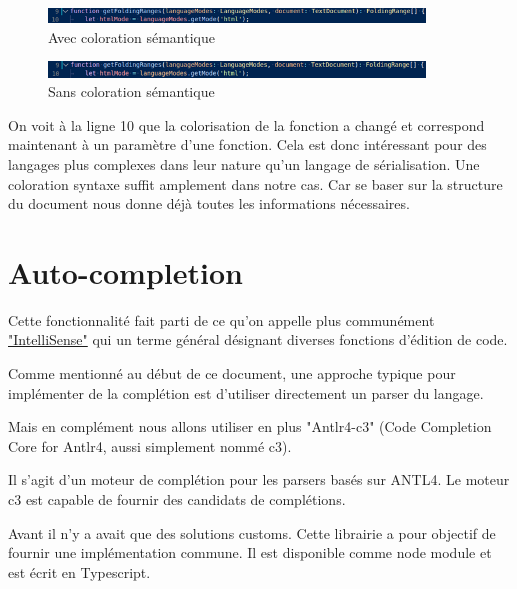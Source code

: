 \documentclass[
    iict, %
    il, %
]{heig-tb}
\begin{document}
\begin{figure}[!ht]
    \begin{center}
        \includegraphics[width=10cm]{assets/figures/semantic-coloration-with.png}
    \end{center}
    \caption[Avec coloration sémantique ]{\label{semantic-coloration-with} Avec coloration sémantique }
\end{figure}

\begin{figure}[!ht]
    \begin{center}
        \includegraphics[width=10cm]{assets/figures/semantic-coloration-without.png}
    \end{center}
    \caption[Sans coloration sémantique]{\label{semantic-coloration-without} Sans coloration sémantique}
\end{figure}

On voit à la ligne 10 que la colorisation de la fonction a changé et correspond maintenant à un paramètre d'une fonction.
Cela est donc intéressant pour des langages plus complexes dans leur nature qu'un langage de sérialisation. Une coloration syntaxe suffit amplement dans notre cas. Car se baser sur la structure du document nous donne déjà toutes les informations nécessaires.

\section{Auto-completion}
Cette fonctionnalité fait parti de ce qu'on appelle plus communément \href{https://code.visualstudio.com/docs/editor/intellisense}{"IntelliSense"} qui un terme général désignant diverses fonctions d'édition de code.

Comme mentionné au début de ce document, une approche typique pour implémenter de la complétion est d'utiliser directement un parser du langage.

Mais en complément nous allons utiliser en plus "Antlr4-c3" (Code Completion Core for Antlr4, aussi simplement nommé c3).

Il s'agit d'un moteur de complétion pour les parsers basés sur ANTL4. Le moteur c3 est capable de fournir des candidats de complétions.

Avant il n'y a avait que des solutions customs. Cette librairie a pour objectif de fournir une implémentation commune. Il est disponible comme node module et est écrit en Typescript.
\end{document}
